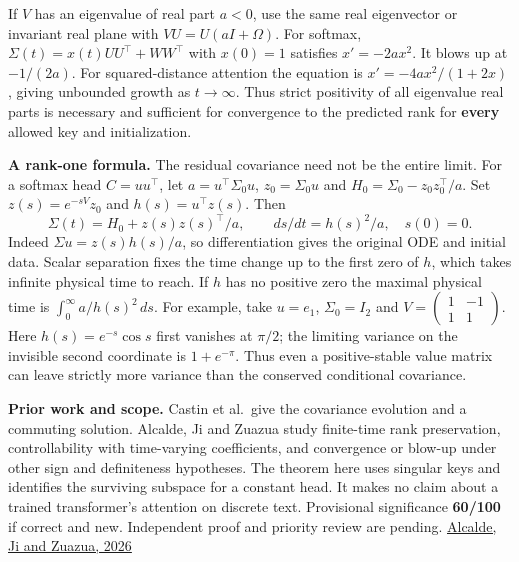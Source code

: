 \documentclass[11pt]{article}
\begin{document}
If \(V\) has an eigenvalue of real part \(a<0\), use the same real eigenvector or invariant real plane with \(VU=U(aI+\Omega)\). For softmax, \(\Sigma(t)=x(t)UU^\top+WW^\top\) with \(x(0)=1\) satisfies \(x'=-2ax^2\). It blows up at \(-1/(2a)\). For squared-distance attention the equation is \(x'=-4ax^2/(1+2x)\), giving unbounded growth as \(t\to\infty\). Thus strict positivity of all eigenvalue real parts is necessary and sufficient for convergence to the predicted rank for \textbf{every} allowed key and initialization.

\textbf{A rank-one formula.} The residual covariance need not be the entire limit. For a softmax head \(C=uu^\top\), let \(a=u^\top\Sigma_0 u\), \(z_0=\Sigma_0u\) and \(H_0=\Sigma_0-z_0z_0^\top/a\). Set \(z(s)=e^{-sV}z_0\) and \(h(s)=u^\top z(s)\). Then \[
 \Sigma(t)=H_0+z(s)z(s)^\top/a,\qquad ds/dt=h(s)^2/a,\quad s(0)=0 .
\] Indeed \(\Sigma u=z(s)h(s)/a\), so differentiation gives the original ODE and initial data. Scalar separation fixes the time change up to the first zero of \(h\), which takes infinite physical time to reach. If \(h\) has no positive zero the maximal physical time is \(\int_0^\infty a/h(s)^2\,ds\). For example, take \(u=e_1\), \(\Sigma_0=I_2\) and \(V=\left(\begin{smallmatrix}1&-1\\1&1\end{smallmatrix}\right)\). Here \(h(s)=e^{-s}\cos s\) first vanishes at \(\pi/2\); the limiting variance on the invisible second coordinate is \(1+e^{-\pi}\). Thus even a positive-stable value matrix can leave strictly more variance than the conserved conditional covariance.

\textbf{Prior work and scope.} Castin et al.~give the covariance evolution and a commuting solution. Alcalde, Ji and Zuazua study finite-time rank preservation, controllability with time-varying coefficients, and convergence or blow-up under other sign and definiteness hypotheses. The theorem here uses singular keys and identifies the surviving subspace for a constant head. It makes no claim about a trained transformer's attention on discrete text. Provisional significance \textbf{60/100} if correct and new. Independent proof and priority review are pending. \href{https://dcn.nat.fau.eu/wp-content/uploads/GaussianTransformer-manuscript.pdf}{Alcalde, Ji and Zuazua, 2026}
\end{document}
